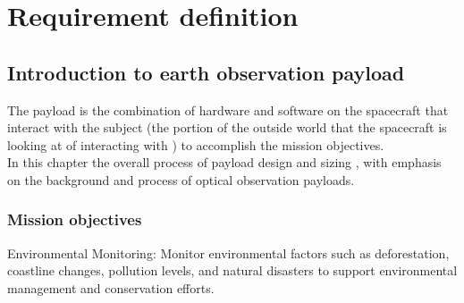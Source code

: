 \chapter{Requirement definition}
\section{Introduction to earth observation payload}
The payload is the combination of hardware and software on the spacecraft that interact with the subject (the portion of the outside world that the spacecraft is looking at of interacting with ) to accomplish the mission objectives. \\
In this chapter the overall process of payload design and sizing , with emphasis on the background and process of optical observation payloads.
\subsection{Mission objectives}
Environmental Monitoring: Monitor environmental factors such as deforestation, coastline changes, pollution levels, and natural disasters to support environmental management and conservation efforts.
